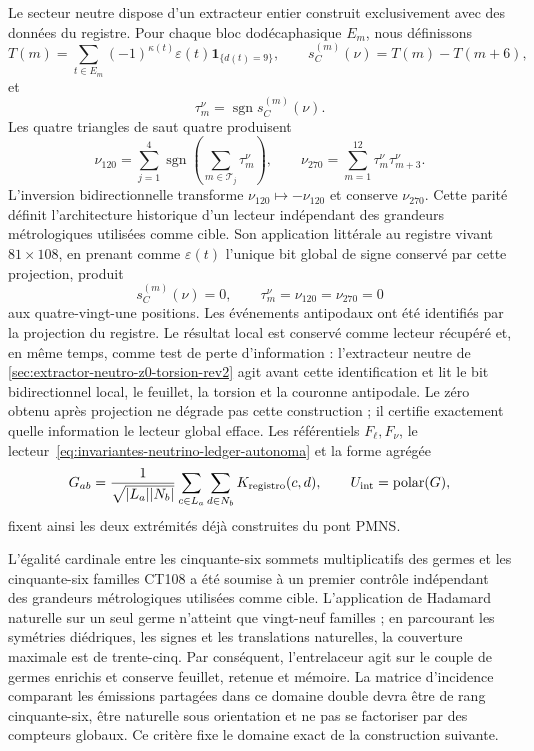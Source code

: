 Le secteur neutre dispose d'un extracteur entier construit exclusivement
avec des données du registre. Pour chaque bloc dodécaphasique \(E_m\), nous définissons
\begin{equation}
 T(m)=\sum_{t\in E_m}(-1)^{\kappa(t)}\varepsilon(t)
       \mathbf1_{\{d(t)=9\}},
 \qquad
 s_C^{(m)}(\nu)=T(m)-T(m+6),
 \label{eq:lector-neutrino-ledger-autonoma}
\end{equation}
et
\begin{equation}
 \tau_m^\nu=\operatorname{sgn}s_C^{(m)}(\nu).
 \label{eq:trit-neutrino-ledger-autonoma}
\end{equation}
Les quatre triangles de saut quatre produisent
\begin{equation}
 \nu_{120}=\sum_{j=1}^{4}
 \operatorname{sgn}\!\left(\sum_{m\in\mathcal T_j}\tau_m^\nu\right),
 \qquad
 \nu_{270}=\sum_{m=1}^{12}\tau_m^\nu\tau_{m+3}^\nu.
 \label{eq:invariantes-neutrino-ledger-autonoma}
\end{equation}
L'inversion bidirectionnelle transforme
\(\nu_{120}\mapsto-\nu_{120}\) et conserve \(\nu_{270}\). Cette parité
définit l'architecture historique d'un lecteur indépendant des grandeurs
métrologiques utilisées comme cible. Son application
littérale au registre vivant \(81\times108\), en prenant comme
\(\varepsilon(t)\) l'unique bit global de signe conservé par cette
projection, produit
\[
 s_C^{(m)}(\nu)=0,
 \qquad \tau_m^\nu=\nu_{120}=\nu_{270}=0
\]
aux quatre-vingt-une positions. Les événements antipodaux ont été
identifiés par la projection du registre. Le résultat local est conservé
comme lecteur récupéré et, en même temps, comme test de perte d'information :
l'extracteur neutre de
\cref{sec:extractor-neutro-z0-torsion-rev2} agit avant cette
identification et lit le bit bidirectionnel local, le feuillet, la torsion et la
couronne antipodale. Le zéro obtenu après projection ne dégrade pas cette
construction ; il certifie exactement quelle information le lecteur global efface.
Les référentiels
\(F_\ell,F_\nu\), le lecteur~\eqref{eq:invariantes-neutrino-ledger-autonoma}
et la forme agrégée
\begin{equation}
 G_{ab}=\frac1{\sqrt{|L_a||N_b|}}
 \sum_{c\in L_a}\sum_{d\in N_b}K_{\rm registro}(c,d),
 \qquad U_{\rm int}=\operatorname{polar}(G),
 \label{eq:kernel-ledger-pmns-autonoma}
\end{equation}
fixent ainsi les deux extrémités déjà construites du pont PMNS.

L'égalité cardinale entre les cinquante-six sommets multiplicatifs des
germes et les cinquante-six familles CT108 a été soumise à un premier
contrôle indépendant des grandeurs métrologiques utilisées comme cible.
L'application de Hadamard naturelle sur un seul germe n'atteint
que vingt-neuf familles ; en parcourant les symétries diédriques, les signes et les
translations naturelles, la couverture maximale est de trente-cinq. Par conséquent,
l'entrelaceur agit sur le couple de germes enrichis et conserve feuillet,
retenue et mémoire. La matrice d'incidence comparant les émissions partagées
dans ce domaine double devra être de rang cinquante-six, être naturelle sous
orientation et ne pas se factoriser par des compteurs globaux. Ce critère fixe le
domaine exact de la construction suivante.
